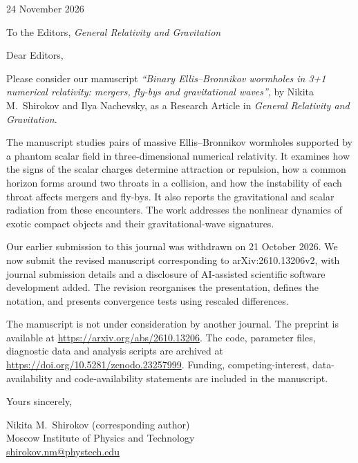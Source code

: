 \documentclass[11pt]{article}
\begin{document}
\begin{flushright}
24 November 2026
\end{flushright}

To the Editors, \emph{General Relativity and Gravitation}

Dear Editors,

Please consider our manuscript \emph{``Binary Ellis--Bronnikov wormholes in 3+1 numerical relativity: mergers, fly-bys and gravitational waves''}, by Nikita M.\ Shirokov and Ilya Nachevsky, as a Research Article in \emph{General Relativity and Gravitation}.

The manuscript studies pairs of massive Ellis--Bronnikov wormholes supported by a phantom scalar field in three-dimensional numerical relativity. It examines how the signs of the scalar charges determine attraction or repulsion, how a common horizon forms around two throats in a collision, and how the instability of each throat affects mergers and fly-bys. It also reports the gravitational and scalar radiation from these encounters. The work addresses the nonlinear dynamics of exotic compact objects and their gravitational-wave signatures.

Our earlier submission to this journal was withdrawn on 21 October 2026. We now submit the revised manuscript corresponding to arXiv:2610.13206v2, with journal submission details and a disclosure of AI-assisted scientific software development added. The revision reorganises the presentation, defines the notation, and presents convergence tests using rescaled differences.

The manuscript is not under consideration by another journal. The preprint is available at \url{https://arxiv.org/abs/2610.13206}. The code, parameter files, diagnostic data and analysis scripts are archived at \url{https://doi.org/10.5281/zenodo.23257999}. Funding, competing-interest, data-availability and code-availability statements are included in the manuscript.

Yours sincerely,

Nikita M.\ Shirokov (corresponding author)\\
Moscow Institute of Physics and Technology\\
\href{mailto:shirokov.nm@phystech.edu}{shirokov.nm@phystech.edu}
\end{document}
